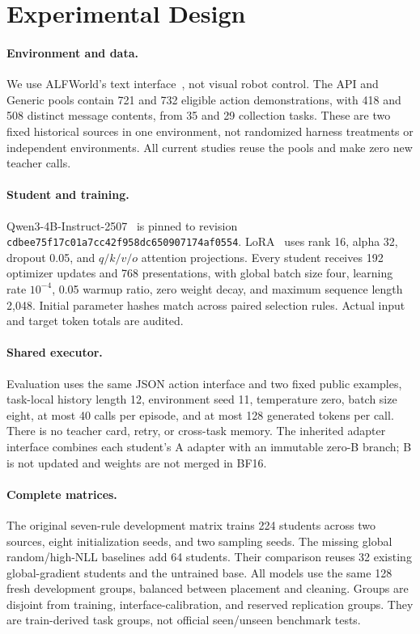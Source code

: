 \documentclass{article}
\begin{document}
\section{Experimental Design}
\paragraph{Environment and data.} We use ALFWorld's text interface~\citep{shridhar2021alfworld}, not visual robot control. The API and Generic pools contain 721 and 732 eligible action demonstrations, with 418 and 508 distinct message contents, from 35 and 29 collection tasks. These are two fixed historical sources in one environment, not randomized harness treatments or independent environments. All current studies reuse the pools and make zero new teacher calls.

\paragraph{Student and training.} Qwen3-4B-Instruct-2507~\citep{yang2025qwen3} is pinned to revision \texttt{cdbee75f17c01a7cc42f958dc650907174af0554}. LoRA~\citep{hu2022lora} uses rank 16, alpha 32, dropout 0.05, and $q/k/v/o$ attention projections. Every student receives 192 optimizer updates and 768 presentations, with global batch size four, learning rate $10^{-4}$, 0.05 warmup ratio, zero weight decay, and maximum sequence length 2,048. Initial parameter hashes match across paired selection rules. Actual input and target token totals are audited.

\paragraph{Shared executor.} Evaluation uses the same JSON action interface and two fixed public examples, task-local history length 12, environment seed 11, temperature zero, batch size eight, at most 40 calls per episode, and at most 128 generated tokens per call. There is no teacher card, retry, or cross-task memory. The inherited adapter interface combines each student's A adapter with an immutable zero-B branch; B is not updated and weights are not merged in BF16.

\paragraph{Complete matrices.} The original seven-rule development matrix trains 224 students across two sources, eight initialization seeds, and two sampling seeds. The missing global random/high-NLL baselines add 64 students. Their comparison reuses 32 existing global-gradient students and the untrained base. All models use the same 128 fresh development groups, balanced between placement and cleaning. Groups are disjoint from training, interface-calibration, and reserved replication groups. They are train-derived task groups, not official seen/unseen benchmark tests.
\end{document}
